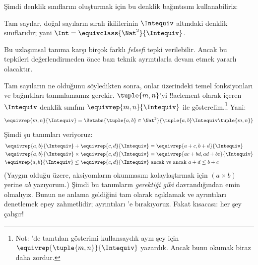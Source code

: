 Şimdi denklik sınıflarını oluşturmak için bu denklik bağıntısını kullanabiliriz:

\begin{defn}
		Tam sayılar, doğal sayıların sıralı ikililerinin $\Intequiv$ altındaki
		denklik sınıflarıdır; yani $\Int = \equivclass{\Nat^2}{\Intequiv}$.
\end{defn}

Bu uzlaşımsal tanıma karşı birçok farklı \emph{felsefi} tepki verilebilir.
Ancak bu tepkileri değerlendirmeden önce bazı teknik ayrıntılarla devam etmek
yararlı olacaktır.

Tam sayıların ne olduğunu söyledikten sonra, onlar üzerindeki temel
fonksiyonları ve bağıntıları tanımlamamız gerekir. $\tuple{m, n}$'yi
!!a{element} olarak içeren $\Intequiv$ denklik sınıfını
$\equivrep{m, n}{\Intequiv}$ ile gösterelim.\footnote{Not:
'de tanıtılan gösterimi kullansaydık
aynı şey için $\equivrep{\tuple{m,n}}{\Intequiv}$ yazardık. Ancak bunu okumak
biraz daha zordur.} Yani:
	$$\equivrep{m, n}{\Intequiv} = \Setabs{\tuple{a, b} \in \Nat^2}{\tuple{a, b}\Intequiv \tuple{m, n}}$$
Şimdi şu tanımları veriyoruz:
	\begin{align*}
		\equivrep{a, b}{\Intequiv} + \equivrep{c, d}{\Intequiv} &= \equivrep{a + c, b + d}{\Intequiv}\\
		\equivrep{a, b}{\Intequiv} \times \equivrep{c, d}{\Intequiv} &= \equivrep{a c + b  d, a  d + b c}{\Intequiv}\\
		\equivrep{a, b}{\Intequiv} \leq \equivrep{c, d}{\Intequiv} &\text{ ancak ve ancak }a + d \leq b + c
	\end{align*}	
(Yaygın olduğu üzere, aksiyomların okunmasını kolaylaştırmak için
$(a \times b)$ yerine $ab$ yazıyorum.) Şimdi bu tanımların
\emph{gerektiği gibi} davrandığından emin olmalıyız. Bunun ne anlama geldiğini
tam olarak açıklamak ve ayrıntıları denetlemek epey zahmetlidir; ayrıntıları
'e bırakıyoruz. Fakat kısacası: her şey çalışır!

